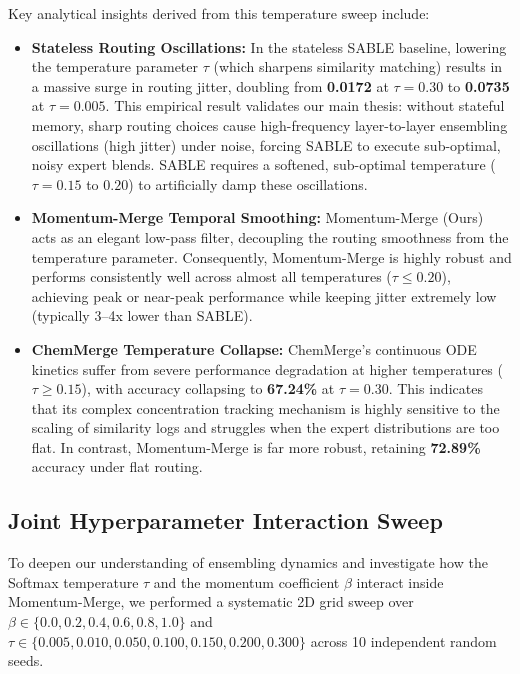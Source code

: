 \documentclass{article}
\theoremstyle{plain}
\theoremstyle{definition}
\theoremstyle{remark}
\begin{document}
Key analytical insights derived from this temperature sweep include:
\begin{itemize}
    \item \textbf{Stateless Routing Oscillations:} In the stateless SABLE baseline, lowering the temperature parameter $\tau$ (which sharpens similarity matching) results in a massive surge in routing jitter, doubling from \textbf{0.0172} at $\tau = 0.30$ to \textbf{0.0735} at $\tau = 0.005$. This empirical result validates our main thesis: without stateful memory, sharp routing choices cause high-frequency layer-to-layer ensembling oscillations (high jitter) under noise, forcing SABLE to execute sub-optimal, noisy expert blends. SABLE requires a softened, sub-optimal temperature ($\tau = 0.15$ to $0.20$) to artificially damp these oscillations.
    \item \textbf{Momentum-Merge Temporal Smoothing:} Momentum-Merge (Ours) acts as an elegant low-pass filter, decoupling the routing smoothness from the temperature parameter. Consequently, Momentum-Merge is highly robust and performs consistently well across almost all temperatures ($\tau \le 0.20$), achieving peak or near-peak performance while keeping jitter extremely low (typically 3--4x lower than SABLE).
    \item \textbf{ChemMerge Temperature Collapse:} ChemMerge's continuous ODE kinetics suffer from severe performance degradation at higher temperatures ($\tau \ge 0.15$), with accuracy collapsing to \textbf{67.24\%} at $\tau = 0.30$. This indicates that its complex concentration tracking mechanism is highly sensitive to the scaling of similarity logs and struggles when the expert distributions are too flat. In contrast, Momentum-Merge is far more robust, retaining \textbf{72.89\%} accuracy under flat routing.
    \end{itemize}

\subsection{Joint Hyperparameter Interaction Sweep}
\label{app:hyperparameter_interaction}

To deepen our understanding of ensembling dynamics and investigate how the Softmax temperature $\tau$ and the momentum coefficient $\beta$ interact inside Momentum-Merge, we performed a systematic 2D grid sweep over $\beta \in \{0.0, 0.2, 0.4, 0.6, 0.8, 1.0\}$ and $\tau \in \{0.005, 0.010, 0.050, 0.100, 0.150, 0.200, 0.300\}$ across 10 independent random seeds. 
\end{document}
